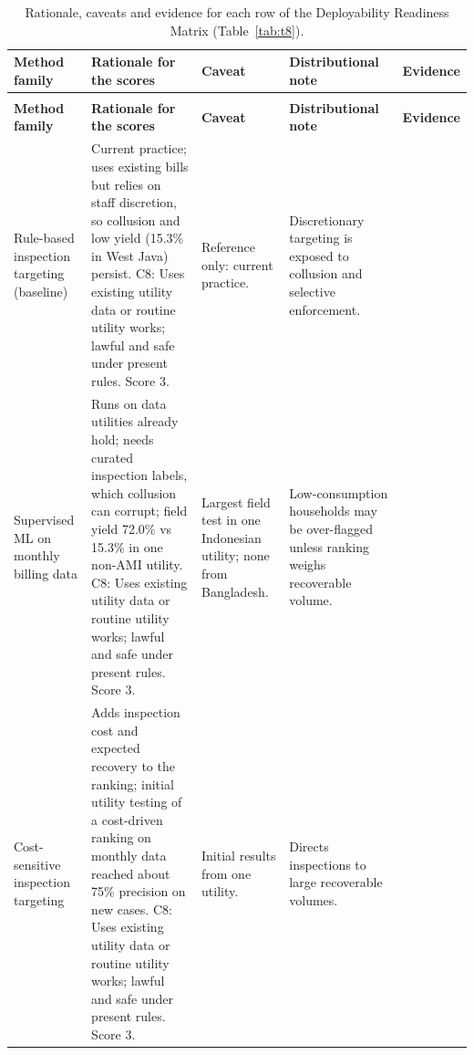 \begingroup
\scriptsize
\renewcommand{\arraystretch}{1.12}
\setlength{\tabcolsep}{3pt}
\begin{xltabular}{\textwidth}{>{\raggedright\arraybackslash{}\hsize}X>{\raggedright\arraybackslash{}\hsize}X>{\raggedright\arraybackslash{}\hsize}X>{\raggedright\arraybackslash{}\hsize}X>{\raggedright\arraybackslash{}\hsize}X}
\caption{Rationale, caveats and evidence for each row of the Deployability Readiness Matrix (Table~\ref{tab:t8}).}\label{tab:t10} \\
\toprule
\textbf{Method family} & \textbf{Rationale for the scores} & \textbf{Caveat} & \textbf{Distributional note} & \textbf{Evidence} \\
\midrule
\endfirsthead
{} \\
\toprule
\textbf{Method family} & \textbf{Rationale for the scores} & \textbf{Caveat} & \textbf{Distributional note} & \textbf{Evidence} \\
\midrule
\endhead
\bottomrule
\endlastfoot
Rule-based inspection targeting (baseline) & Current practice; uses existing bills but relies on staff discretion, so collusion and low yield (15.3\% in West Java) persist. C8: Uses existing utility data or routine utility works; lawful and safe under present rules. Score 3. & Reference only: current practice. & Discretionary targeting is exposed to collusion and selective enforcement. & \citealp{haramaini2026hybrid,guerrero2018non,lovei2000costs} \\
Supervised ML on monthly billing data & Runs on data utilities already hold; needs curated inspection labels, which collusion can corrupt; field yield 72.0\% vs 15.3\% in one non-AMI utility. C8: Uses existing utility data or routine utility works; lawful and safe under present rules. Score 3. & Largest field test in one Indonesian utility; none from Bangladesh. & Low-consumption households may be over-flagged unless ranking weighs recoverable volume. & \citealp{haramaini2026hybrid,guerrero2018non,gusmao2020customer,comapuig2016fraud,janthong2024feature,seepromting2026multiclass,oprea2022feature,glauner2017is} \\
Cost-sensitive inspection targeting & Adds inspection cost and expected recovery to the ranking; initial utility testing of a cost-driven ranking on monthly data reached about 75\% precision on new cases. C8: Uses existing utility data or routine utility works; lawful and safe under present rules. Score 3. & Initial results from one utility. & Directs inspections to large recoverable volumes. & \citealp{alharbi2021electricity} \\

\end{xltabular}
